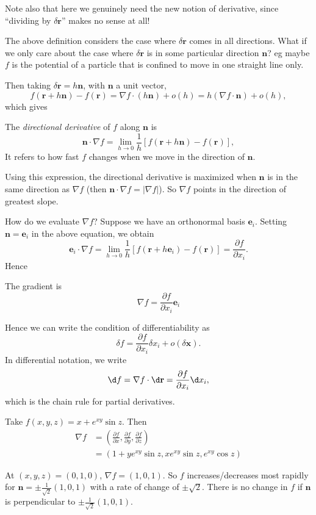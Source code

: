 \documentclass[a4paper]{article}
\begin{document}
Note also that here we genuinely need the new notion of derivative, since ``dividing by $\delta \mathbf{r}$'' makes no sense at all!

The above definition considers the case where $\delta \mathbf{r}$ comes in all directions. What if we only care about the case where $\delta \mathbf{r}$ is in some particular direction $\mathbf{n}$? eg maybe $f$ is the potential of a particle that is confined to move in one straight line only.

Then taking $\delta \mathbf{r} = h\mathbf{n}$, with $\mathbf{n}$ a unit vector,
\[
  f(\mathbf{r} + h\mathbf{n}) - f(\mathbf{r}) = \nabla f \cdot (h\mathbf{n}) + o(h) = h(\nabla f\cdot \mathbf{n}) + o(h),
\]
which gives
\begin{defi}
  The \emph{directional derivative} of $f$ along $\mathbf{n}$ is
  \[
    \mathbf{n}\cdot \nabla f = \lim_{h \to 0} \frac{1}{h}[f(\mathbf{r} + h\mathbf{n}) - f(\mathbf{r})],
  \]
  It refers to how fast $f$ changes when we move in the direction of $\mathbf{n}$.
\end{defi}
Using this expression, the directional derivative is maximized when $\mathbf{n}$ is in the same direction as $\nabla f$ (then $\mathbf{n}\cdot \nabla f = |\nabla f|$). So $\nabla f$ points in the direction of greatest slope.

How do we evaluate $\nabla f$? Suppose we have an orthonormal basis $\mathbf{e}_i$. Setting $\mathbf{n} = \mathbf{e}_i$ in the above equation, we obtain
\[
  \mathbf{e}_i \cdot \nabla f = \lim_{h\to 0} \frac{1}{h}[f(\mathbf{r} + h\mathbf{e}_i) - f(\mathbf{r})] = \frac{\partial f}{\partial x_i}.
\]
Hence 
\begin{thm}
  The gradient is
  \[
    \nabla f = \frac{\partial f}{\partial x_i}\mathbf{e}_i
  \]
\end{thm}

Hence we can write the condition of differentiability as
\[
  \delta f = \frac{\partial f}{\partial x_i}\delta x_i + o(\delta \mathbf{x}).
\]
In differential notation, we write
\[ 
  \d f = \nabla f\cdot \d \mathbf{r} = \frac{\partial f}{\partial x_i}\d x_i,
\]
which is the chain rule for partial derivatives.

\begin{eg}
  Take $f(x, y, z) = x + e^{xy}\sin z$. Then
  \begin{align*}
    \nabla f &= \left(\frac{\partial f}{\partial x}, \frac{\partial f}{\partial y}, \frac{\partial f}{\partial z}\right)\\
    &= (1 + ye^{xy}\sin z, xe^{xy}\sin z, e^{xy}\cos z)
  \end{align*}

  At  $(x, y, z) = (0, 1, 0)$, $\nabla f = (1, 0, 1)$. So $f$ increases/decreases most rapidly for $\mathbf{n} = \pm \frac{1}{\sqrt{2}}(1, 0, 1)$ with a rate of change of $\pm \sqrt{2}$. There is no change in $f$ if $\mathbf{n}$ is perpendicular to $\pm \frac{1}{\sqrt{2}}(1, 0, 1)$.
\end{eg}
\end{document}
